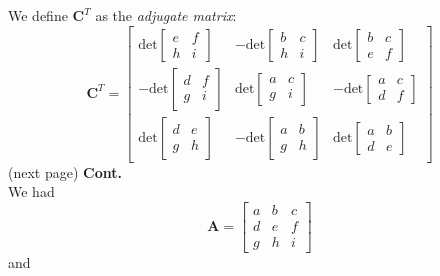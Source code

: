 \documentclass{report}
\begin{document}
We define $\bm C^T$ as the \textit{adjugate matrix}:
\begin{equation*}
\bm C^T=
\left[\begin{array}{ccc}
\text{det}\left[\begin{array}{cc}e&f\\h&i\end{array}\right]&
-\text{det}\left[\begin{array}{cc}b&c\\h&i\end{array}\right]&
\text{det}\left[\begin{array}{cc}b&c\\e&f\end{array}\right]\\
-\text{det}\left[\begin{array}{cc}d&f\\g&i\end{array}\right]&
\text{det}\left[\begin{array}{cc}a&c\\g&i\end{array}\right]&
-\text{det}\left[\begin{array}{cc}a&c\\d&f\end{array}\right]\\
\text{det}\left[\begin{array}{cc}d&e\\g&h\end{array}\right]&
-\text{det}\left[\begin{array}{cc}a&b\\g&h\end{array}\right]&
\text{det}\left[\begin{array}{cc}a&b\\d&e\end{array}\right]
\end{array}\right]
\end{equation*}
(next page)\newpage
\noindent\textbf{Cont.}\\
We had
\begin{equation*}
\bm A=
\left[\begin{array}{ccc}
a&b&c\\d&e&f\\g&h&i
\end{array}\right]
\end{equation*}
and
\end{document}
